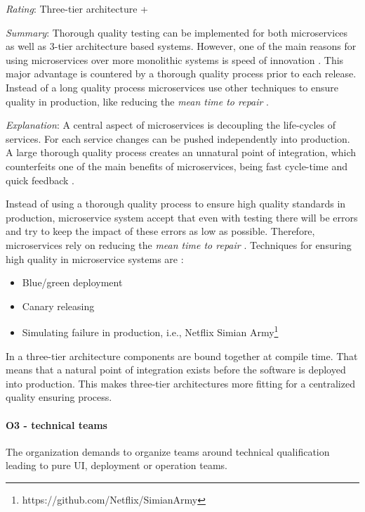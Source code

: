 \textit{Rating}: Three-tier architecture +

\textit{Summary}:
Thorough quality testing can be implemented for both microservices as well as 3-tier architecture based systems.
However, one of the main reasons for using microservices over more monolithic systems is speed of innovation \cite{Vogels2006}.
This major advantage is countered by a thorough quality process prior to each release.
Instead of a long quality process microservices use other techniques to ensure quality in production, like reducing the \textit{mean time to repair} \citep[p. 150]{Newman2015}. 

\textit{Explanation}:
A central aspect of microservices is decoupling the life-cycles of services.
For each service changes can be pushed independently into production.
A large thorough quality process creates an unnatural point of integration, which counterfeits one of the main benefits of microservices, being fast cycle-time and quick feedback \citep[p. 105]{Newman2015}\citep[p. 153]{Newman2015}.

Instead of using a thorough quality process to ensure high quality standards in production, microservice system accept that even with testing there will be errors and try to keep the impact of these errors as low as possible.
Therefore, microservices rely on reducing the \textit{mean time to repair} \citep[p. 150]{Newman2015}. 
Techniques for ensuring high quality in microservice systems are \citep[p.148ff.]{Newman2015} \citep[p. 210]{Newman2015}:
\begin{itemize}
\item Blue/green deployment
\item Canary releasing
\item Simulating failure in production, i.e., Netflix Simian Army\footnote{https://github.com/Netflix/SimianArmy}
\end{itemize}

In a three-tier architecture components are bound together at compile time.
That means that a natural point of integration exists before the software is deployed into production.
This makes three-tier architectures more fitting for a centralized quality ensuring process.

\paragraph{O3 - technical teams}
The organization demands to organize teams around technical qualification leading to pure UI, deployment or operation teams.
\label{quaMicro:so3}

